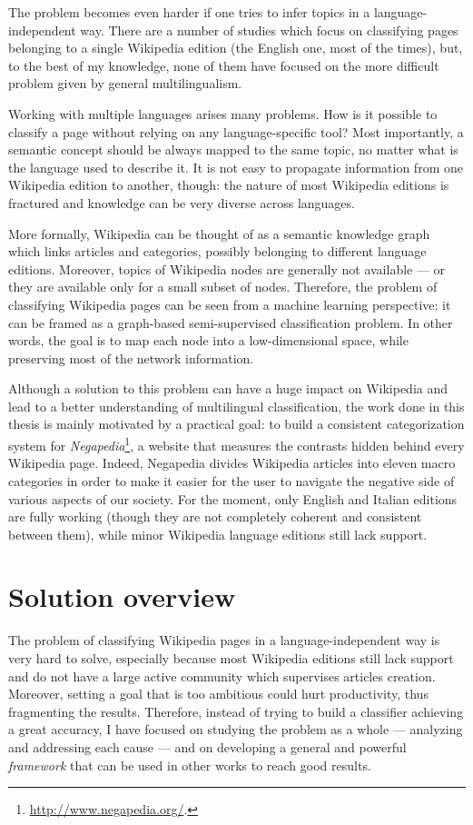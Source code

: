         The problem becomes even harder if one tries to infer topics in a language-independent way. There are a number of studies which focus on classifying pages belonging to a single Wikipedia edition (the English one, most of the times), but, to the best of my knowledge, none of them have focused on the more difficult problem given by general multilingualism.
        
        Working with multiple languages arises many problems. How is it possible to classify a page without relying on any language-specific tool? Most importantly, a semantic concept should be always mapped to the same topic, no matter what is the language used to describe it. It is not easy to propagate information from one Wikipedia edition to another, though: the nature of most Wikipedia editions is fractured and knowledge can be very diverse across languages.
        
        More formally, Wikipedia can be thought of as a semantic knowledge graph which links articles and categories, possibly belonging to different language editions. Moreover, topics of Wikipedia nodes are generally not available --- or they are available only for a small subset of nodes. Therefore, the problem of classifying Wikipedia pages can be seen from a machine learning perspective: it can be framed as a graph-based semi-supervised classification problem. In other words, the goal is to map each node into a low-dimensional space, while preserving most of the network information.
        
        Although a solution to this problem can have a huge impact on Wikipedia and lead to a better understanding of multilingual classification, the work done in this thesis is mainly motivated by a practical goal: to build a consistent categorization system for \emph{Negapedia}\footnote{\url{http://www.negapedia.org/}.}, a website that measures the contrasts hidden behind every Wikipedia page. Indeed, Negapedia divides Wikipedia articles into eleven macro categories in order to make it easier for the user to navigate the negative side of various aspects of our society. For the moment, only English and Italian editions are fully working (though they are not completely coherent and consistent between them), while minor Wikipedia language editions still lack support.
    \section{Solution overview}\label{solution_overview}
        The problem of classifying Wikipedia pages in a language-independent way is very hard to solve, especially because most Wikipedia editions still lack support and do not have a large active community which supervises articles creation. Moreover, setting a goal that is too ambitious could hurt productivity, thus fragmenting the results. Therefore, instead of trying to build a classifier achieving a great accuracy, I have focused on studying the problem as a whole --- analyzing and addressing each cause --- and on developing a general and powerful \emph{framework} that can be used in other works to reach good results.
        
